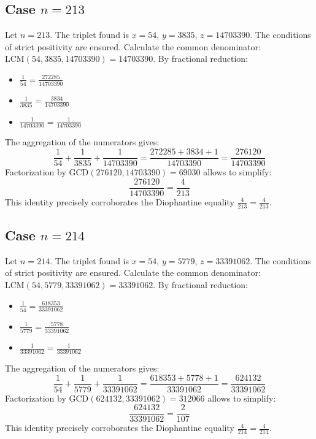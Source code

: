 \documentclass[11pt,a4paper]{article}
\begin{document}
\subsection{Case $n = 213$}
Let $n = 213$. The triplet found is $x = 54$, $y = 3835$, $z = 14703390$.
The conditions of strict positivity are ensured.
Calculate the common denominator: $\text{LCM}(54, 3835, 14703390) = 14703390$.
By fractional reduction:
\begin{itemize}
    \item $\frac{1}{54} = \frac{272285}{14703390}$
    \item $\frac{1}{3835} = \frac{3834}{14703390}$
    \item $\frac{1}{14703390} = \frac{1}{14703390}$
\end{itemize}
The aggregation of the numerators gives:
$$ \frac{1}{54} + \frac{1}{3835} + \frac{1}{14703390} = \frac{272285 + 3834 + 1}{14703390} = \frac{276120}{14703390} $$
Factorization by $\text{GCD}(276120, 14703390) = 69030$ allows to simplify:
$$ \frac{276120}{14703390} = \frac{4}{213} $$
This identity precisely corroborates the Diophantine equality $\frac{4}{213} = \frac{4}{213}$.

\subsection{Case $n = 214$}
Let $n = 214$. The triplet found is $x = 54$, $y = 5779$, $z = 33391062$.
The conditions of strict positivity are ensured.
Calculate the common denominator: $\text{LCM}(54, 5779, 33391062) = 33391062$.
By fractional reduction:
\begin{itemize}
    \item $\frac{1}{54} = \frac{618353}{33391062}$
    \item $\frac{1}{5779} = \frac{5778}{33391062}$
    \item $\frac{1}{33391062} = \frac{1}{33391062}$
\end{itemize}
The aggregation of the numerators gives:
$$ \frac{1}{54} + \frac{1}{5779} + \frac{1}{33391062} = \frac{618353 + 5778 + 1}{33391062} = \frac{624132}{33391062} $$
Factorization by $\text{GCD}(624132, 33391062) = 312066$ allows to simplify:
$$ \frac{624132}{33391062} = \frac{2}{107} $$
This identity precisely corroborates the Diophantine equality $\frac{4}{214} = \frac{4}{214}$.
\end{document}
